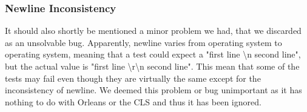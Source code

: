 \subsubsection{Newline Inconsistency}
It should also shortly be mentioned a minor problem we had, that we discarded as an unsolvable bug. Apparently, newline varies from operating system to operating system, meaning that a test could expect a "first line \textbackslash n second line", but the actual value is "first line \textbackslash r\textbackslash n second line". This mean that some of the tests may fail even though they are virtually the same except for the inconsistency of newline. We deemed this problem or bug unimportant as it has nothing to do with Orleans or the CLS and thus it has been ignored.

